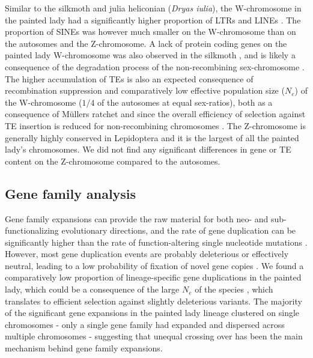 \documentclass[twocolumn]{bmcart}%
\begin{document}
Similar to the silkmoth and julia heliconian (\textit{Dryas iulia}), the W-chromosome in the painted lady had a significantly higher proportion of LTRs and LINEs \citep{lewisDryasIuliaGenome2021, mitaGenomeSequenceSilkworm2004}. The proportion of SINEs was however much smaller on the W-chromosome than on the autosomes and the Z-chromosome. A lack of protein coding genes on the painted lady W-chromosome was also observed in the silkmoth \citep{abeIdentificationFemaledeterminingRegion2008,mitaGenomeSequenceSilkworm2004}, and is likely a consequence of the degradation process of the non-recombining sex-chromosome \citep{bachtrogChromosomeEvolutionEmerging2013}. The higher accumulation of TEs is also an expected consequence of recombination suppression and comparatively low effective population size ($N_e$) of the W-chromosome ($1/4$ of the autosomes at equal sex-ratios), both as a consequence of Müllers ratchet and since the overall efficiency of selection against TE insertion is reduced for non-recombining chromosomes \citep{bachtrogChromosomeEvolutionEmerging2013}. The Z-chromosome is generally highly conserved in Lepidoptera \citep{fraisseDeepConservationLepidoptera2017} and it is the largest of all the painted lady’s chromosomes. We did not find any significant differences in gene or TE content on the Z-chromosome compared to the autosomes.

\subsection*{Gene family analysis}
Gene family expansions can provide the raw material for both neo- and sub-functionalizing evolutionary directions, and the rate of gene duplication can be significantly higher than the rate of function-altering single nucleotide mutations \citep{lipinskiHighSpontaneousRate2011}. However, most gene duplication events are probably deleterious \citep{loehlinExpressionTandemGene2016} or effectively neutral, leading to a low probability of fixation of novel gene copies \citep{emersonNaturalSelectionShapes2008}. We found a comparatively low proportion of lineage-specific gene duplications in the painted lady, which could be a consequence of the large $N_e$ of the species \citep{garcia-berroGenomicDemographicInferenceinprep}, which translates to efficient selection against slightly deleterious variants. The majority of the significant gene expansions in the painted lady lineage clustered on single chromosomes - only a single gene family had expanded and dispersed across multiple chromosomes - suggesting that unequal crossing over has been the main mechanism behind gene family expansions.
\end{document}
